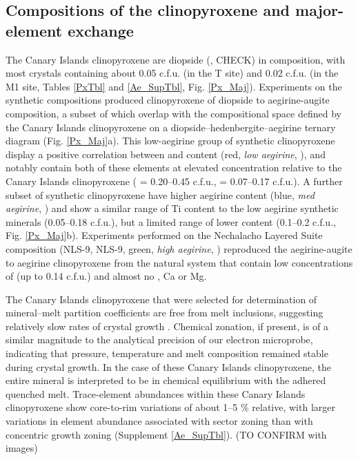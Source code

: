 \documentclass[review,authoryear,12pt]{elsarticle}
\begin{document}

\subsection{Compositions of the clinopyroxene and major-element exchange}
The Canary Islands clinopyroxene are diopside (,  CHECK) in composition, with most crystals containing about 0.05 c.f.u.  (in the T site) and 0.02 c.f.u.  (in the M1 site, Tables \ref{PxTbl} and \ref{Ae_SupTbl}, Fig. \ref{Px_Maj}). 
Experiments on the synthetic compositions produced clinopyroxene of diopside to aegirine-augite composition, a subset of which overlap with the compositional space defined by the Canary Islands clinopyroxene on a diopside--hedenbergite--aegirine ternary diagram (Fig. \ref{Px_Maj}a). This low-aegirine group of synthetic clinopyroxene display a positive correlation between  and  content (red, \emph{low aegirine}, ), and notably contain both of these elements at elevated concentration relative to the Canary Islands clinopyroxene ( = 0.20--0.45 c.f.u.,  = 0.07--0.17 c.f.u.). A further subset of synthetic clinopyroxene have higher aegirine content (blue, \emph{med aegirine}, ) and show a similar range of Ti content to the low aegirine synthetic minerals (0.05--0.18 c.f.u.), but a limited range of lower  content (0.1--0.2 c.f.u., Fig. \ref{Px_Maj}b). Experiments performed on the Nechalacho Layered Suite composition (NLS-9, NLS-9, green, \emph{high aegirine}, ) reproduced the aegirine-augite to aegirine clinopyroxene from the natural system \citep{Moller2016} that contain low concentrations of  (up to 0.14 c.f.u.) and almost no , Ca or Mg.


 The Canary Islands clinopyroxene that were selected for determination of mineral--melt partition coefficients are free from melt inclusions, suggesting relatively slow rates of crystal growth \citep[][Fig. \ref{3_ChemTransect}]{Kennedy1993}. Chemical zonation, if present, is of a similar magnitude to the analytical precision of our electron microprobe, indicating that pressure, temperature and melt composition remained stable during crystal growth. In the case of these Canary Islands clinopyroxene, the entire mineral is interpreted to be in chemical equilibrium with the adhered quenched melt. %
Trace-element abundances within these Canary Islands clinopyroxene show core-to-rim variations of about 1--5 \% relative, with larger variations in element abundance associated with sector zoning than with concentric growth zoning (Supplement \ref{Ae_SupTbl}). (TO CONFIRM with images)
\end{document}
